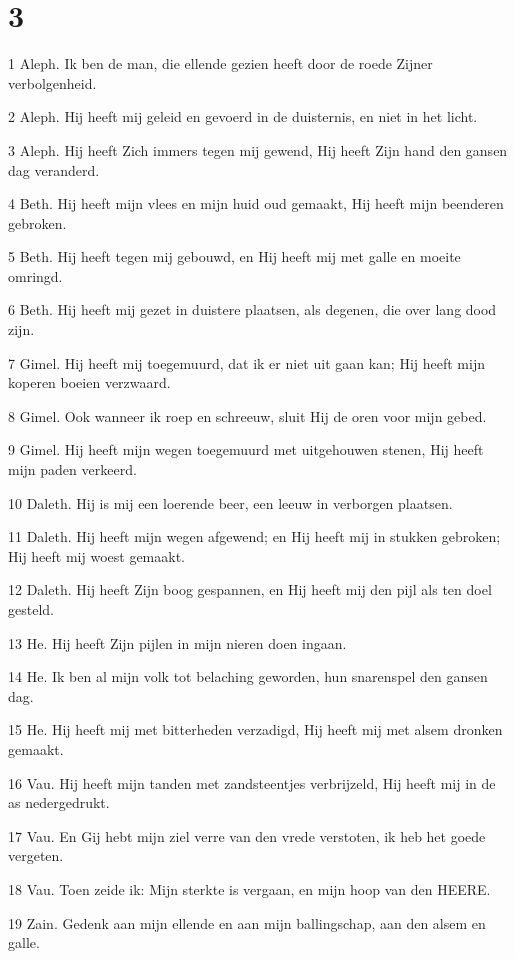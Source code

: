 \chapter{3}

\par 1 Aleph. Ik ben de man, die ellende gezien heeft door de roede Zijner verbolgenheid.
\par 2 Aleph. Hij heeft mij geleid en gevoerd in de duisternis, en niet in het licht.
\par 3 Aleph. Hij heeft Zich immers tegen mij gewend, Hij heeft Zijn hand den gansen dag veranderd.
\par 4 Beth. Hij heeft mijn vlees en mijn huid oud gemaakt, Hij heeft mijn beenderen gebroken.
\par 5 Beth. Hij heeft tegen mij gebouwd, en Hij heeft mij met galle en moeite omringd.
\par 6 Beth. Hij heeft mij gezet in duistere plaatsen, als degenen, die over lang dood zijn.
\par 7 Gimel. Hij heeft mij toegemuurd, dat ik er niet uit gaan kan; Hij heeft mijn koperen boeien verzwaard.
\par 8 Gimel. Ook wanneer ik roep en schreeuw, sluit Hij de oren voor mijn gebed.
\par 9 Gimel. Hij heeft mijn wegen toegemuurd met uitgehouwen stenen, Hij heeft mijn paden verkeerd.
\par 10 Daleth. Hij is mij een loerende beer, een leeuw in verborgen plaatsen.
\par 11 Daleth. Hij heeft mijn wegen afgewend; en Hij heeft mij in stukken gebroken; Hij heeft mij woest gemaakt.
\par 12 Daleth. Hij heeft Zijn boog gespannen, en Hij heeft mij den pijl als ten doel gesteld.
\par 13 He. Hij heeft Zijn pijlen in mijn nieren doen ingaan.
\par 14 He. Ik ben al mijn volk tot belaching geworden, hun snarenspel den gansen dag.
\par 15 He. Hij heeft mij met bitterheden verzadigd, Hij heeft mij met alsem dronken gemaakt.
\par 16 Vau. Hij heeft mijn tanden met zandsteentjes verbrijzeld, Hij heeft mij in de as nedergedrukt.
\par 17 Vau. En Gij hebt mijn ziel verre van den vrede verstoten, ik heb het goede vergeten.
\par 18 Vau. Toen zeide ik: Mijn sterkte is vergaan, en mijn hoop van den HEERE.
\par 19 Zain. Gedenk aan mijn ellende en aan mijn ballingschap, aan den alsem en galle.
